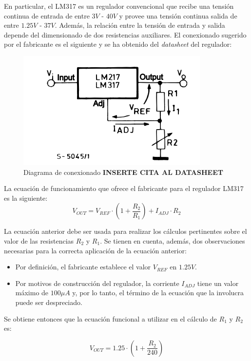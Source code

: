 En particular, el LM317 es un regulador convencional que recibe una tensión continua de entrada de entre $3V$ - $40V$ y provee una tensión continua salida de entre $1.25V$ - $37V$. Además, la relación entre la tensión de entrada y salida depende del dimensionado de dos resistencias auxiliares. El conexionado sugerido por el fabricante es el siguiente y se ha obtenido del \textit{datasheet} del regulador:

\begin{figure}[H]
    \centering 
    \includegraphics[width=.6\linewidth]{pictures/LM317 conexionado.PNG}
    \caption{Diagrama de conexionado \textbf{INSERTE CITA AL DATASHEET}}
    \label{fig:CAMBIAR!!!!!!!!!!}
\end{figure}

La ecuación de funcionamiento que ofrece el fabricante para el regulador LM317 es la siguiente:
\begin{equation}
    V_{OUT} = V_{REF} \cdot \left( 1 + \frac{R_2}{R_1}\right) + I_{ADJ} \cdot R_2
\end{equation}

La ecuación anterior debe ser usada para realizar los cálculos pertinentes sobre el valor de las resistencias $R_2$ y $R_1$. Se tienen en cuenta, además, dos observaciones necesarias para la correcta aplicación de la ecuación anterior:
\begin{itemize}
    \item Por definición, el fabricante establece el valor $V_{REF}$ en $1.25V$.
    \item Por motivos de construcción del regulador, la corriente $I_{ADJ}$ tiene un valor máximo de $100 \mu A$ y, por lo tanto, el término de la ecuación que la involucra puede ser despreciado.
\end{itemize}

Se obtiene entonces que la ecuación funcional a utilizar en el cálculo de $R_1$ y $R_2$ es:

\begin{equation}
    V_{OUT} = 1.25 \cdot \left( 1 + \frac{R_2}{240}\right) 
\end{equation}

